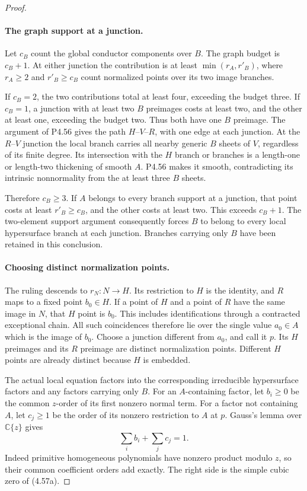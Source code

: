 \begin{proof}
\paragraph{The graph support at a junction.}
Let $c_B$ count the global conductor components over $B$.
The graph budget is $c_B+1$. At either junction the
contribution is at least $\min(r_A,r'_B)$, where
$r_A\ge2$ and $r'_B\ge c_B$ count normalized points
over its two image branches.

If $c_B=2$, the two contributions total at least four,
exceeding the budget three. If $c_B=1$, a junction with
at least two $B$ preimages costs at least two, and the
other at least one, exceeding the budget two. Thus both
have one $B$ preimage. The argument of P4.56 gives the
path $H$--$V$--$R$, with one edge at each junction.
At the $R$--$V$ junction the local branch carries all
nearby generic $B$ sheets of $V$, regardless of its
finite degree. Its intersection with the $H$ branch or
branches is a length-one or length-two thickening of
smooth $A$. P4.56 makes it smooth, contradicting its
intrinsic nonnormality from the at least three $B$ sheets.

Therefore $c_B\ge3$. If $A$ belongs to every branch
support at a junction, that point costs at least
$r'_B\ge c_B$, and the other costs at least two.
This exceeds $c_B+1$. The two-element support argument
consequently forces $B$ to belong to every local
hypersurface branch at each junction. Branches carrying
only $B$ have been retained in this conclusion.

\paragraph{Choosing distinct normalization points.}
The ruling descends to $r_N:N\to H$. Its restriction
to $H$ is the identity, and $R$ maps to a fixed point
$b_0\in H$. If a point of $H$ and a point of $R$ have
the same image in $N$, that $H$ point is $b_0$.
This includes identifications through a contracted
exceptional chain. All such coincidences therefore lie
over the single value $a_0\in A$ which is the image of
$b_0$. Choose a junction different from $a_0$, and call
it $p$. Its $H$ preimages and its $R$ preimage are
distinct normalization points. Different $H$ points
are already distinct because $H$ is embedded.

The actual local equation factors into the corresponding
irreducible hypersurface factors and any factors carrying
only $B$. For an $A$-containing factor, let $b_i\ge0$
be the common $z$-order of its first nonzero normal term.
For a factor not containing $A$, let $c_j\ge1$ be the
order of its nonzero restriction to $A$ at $p$.
Gauss's lemma over $\mathbb C\{z\}$ gives
\[
                         \sum_i b_i+\sum_j c_j=1.         \tag{4.57b}
\]
Indeed primitive homogeneous polynomials have nonzero
product modulo $z$, so their common coefficient orders
add exactly. The right side is the simple cubic zero
of (4.57a).


\end{proof}
